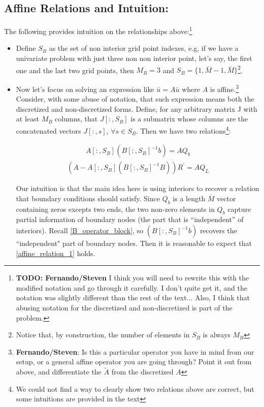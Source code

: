 \documentclass[11pt]{article}
\begin{document}
		\subsection{Affine Relations and Intuition:}
		The following provides intuition on the relationships above:\footnote{\textbf{TODO: Fernando/Steven} I think you will need to rewrite this with the modified notation and go through it carefully.  I don't quite get it, and the notation was slightly different than the rest of the text...  Also, I think that abusing notation for the discretized and non-discretized is part of the problem.}
		\begin{itemize}
		\item Define $S_B$ as the set of non interior grid point indexes, e.g, if we have a univariate problem with just three non non interior point, let's say, the first one and the last two grid points, then $M_B = 3$ and $S_B = \{1,\bar{M}-1,\bar{M}\}$\footnote{Notice that, by construction, the number of elements in $S_B$ is always $M_B$}.
			\item Now let's focus on solving an expression like $\bar{u} = A \bar{u}$ where $A$ is affine.\footnote{\textbf{Fernando/Steven}: Is this a particular operator you have in mind from our setup, or a general affine operator you are going through?  Point it out from above, and differentiate the $\tilde{A}$ from the discretized $A$} Consider, with some abuse of notation, that such expression means both the discretized and non-discretized forms. Define, for any arbitrary matrix J with at least $M_B$ columns, that $J[:,S_B]$ is a submatrix whose columns are the concatenated vectors $J[:,s]$, $\forall s \in S_B$.
			Then we have two relations\footnote{We could not find a way to clearly show two relations above are correct, but some intuitions are provided in the text}:

			\begin{align}
			A [:,S_B] \left(B[:,S_B]^{-1} b \right) = A  Q_b\label{affine_relation_1}
			\end{align}
			\begin{align}
			(A -A [:,S_B] (B[:,S_B]^{-1} B)) R^{'} = A  Q_L\label{affine_relation_2}
			\end{align}

			Our intuition is that the main idea here is using interiors to recover a relation that boundary conditions should satisfy. Since $Q_b$ is a length $\bar{M}$ vector containing zeros excepts two ends, the two non-zero elements in $Q_b$ capture partial information of boundary nodes (the part that is ``independent'' of interiors).  Recall \eqref{B_operator_block}, so $\left(B[:,S_B]^{-1} b \right)$ recovers the ``independent" part of boundary nodes. Then it is reasonable to expect that \eqref{affine_relation_1} holds.


\end{itemize}
\end{document}
